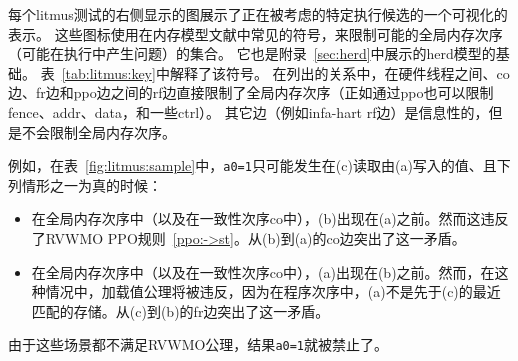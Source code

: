每个litmus测试的右侧显示的图展示了正在被考虑的特定执行候选的一个可视化的表示。
这些图标使用在内存模型文献中常见的符号，来限制可能的全局内存次序（可能在执行中产生问题）的集合。
它也是附录~\ref{sec:herd}中展示的\textsf{herd}模型的基础。
表~\ref{tab:litmus:key}中解释了该符号。
在列出的关系中，在硬件线程之间、{\sf co}边、{\sf fr}边和{\sf ppo}边之间的{\sf rf}边直接限制了全局内存次序（正如通过{\sf ppo}也可以限制{\sf fence}、{\sf addr}、{\sf data}，和一些{\sf ctrl}）。
其它边（例如infa-hart {\sf rf}边）是信息性的，但是不会限制全局内存次序。

例如，在表~\ref{fig:litmus:sample}中，{\tt a0=1}只可能发生在(c)读取由(a)写入的值、且下列情形之一为真的时候：
\begin{itemize}
  \item 在全局内存次序中（以及在一致性次序{\sf co}中），(b)出现在(a)之前。然而这违反了RVWMO PPO规则~\ref{ppo:->st}。从(b)到(a)的{\sf co}边突出了这一矛盾。
  \item 在全局内存次序中（以及在一致性次序{\sf co}中），(a)出现在(b)之前。然而，在这种情况中，加载值公理将被违反，因为在程序次序中，(a)不是先于(c)的最近匹配的存储。从(c)到(b)的{\sf fr}边突出了这一矛盾。
\end{itemize}
由于这些场景都不满足RVWMO公理，结果{\tt a0=1}就被禁止了。

